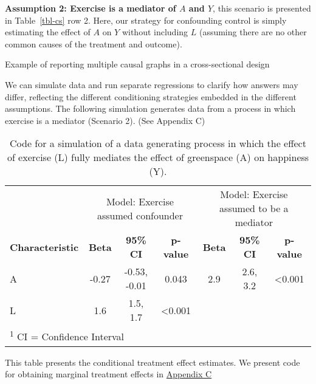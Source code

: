 \documentclass[
  single column]{article}
\begin{document}
\textbf{Assumption 2: Exercise is a mediator of \(A\) and \(Y\)}, this
scenario is presented in Table~\ref{tbl-cs} row 2. Here, our strategy
for confounding control is simply estimating the effect of \(A\) on
\(Y\) without including \(L\) (assuming there are no other common causes
of the treatment and outcome).

\begin{table}

\caption{\label{tbl-cs}Example of reporting multiple causal graphs in a
cross-sectional design}

\centering{

\examplecrosssection

}

\end{table}%

We can simulate data and run separate regressions to clarify how answers
may differ, reflecting the different conditioning strategies embedded in
the different assumptions. The following simulation generates data from
a process in which exercise is a mediator (Scenario 2). (See Appendix C)

\begin{table}
\caption{Code for a simulation of a data generating process in which the effect
of exercise (L) fully mediates the effect of greenspace (A) on happiness
(Y).}\tabularnewline

\centering
\begin{tabular}{lcccccc}
\toprule
\multicolumn{1}{c}{ } & \multicolumn{3}{c}{Model: Exercise assumed confounder} & \multicolumn{3}{c}{Model: Exercise assumed to be a mediator} \\
\cmidrule(l{3pt}r{3pt}){2-4} \cmidrule(l{3pt}r{3pt}){5-7}
\textbf{Characteristic} & \textbf{Beta} & \textbf{95\% CI} & \textbf{p-value} & \textbf{Beta} & \textbf{95\% CI} & \textbf{p-value}\\
\midrule
A & -0.27 & -0.53, -0.01 & 0.043 & 2.9 & 2.6, 3.2 & <0.001\\
L & 1.6 & 1.5, 1.7 & <0.001 &  &  & \\
\bottomrule
\multicolumn{7}{l}{\rule{0pt}{1em}\textsuperscript{1} CI = Confidence Interval}\\
\end{tabular}
\end{table}

This table presents the conditional treatment effect estimates. We
present code for obtaining marginal treatment effects in
\hyperref[appendix-c]{Appendix C}
\end{document}
